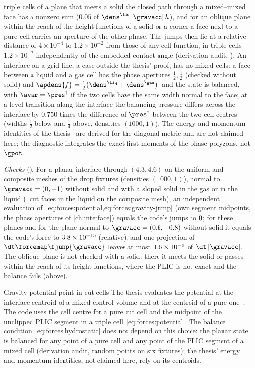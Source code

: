triple cells of a plane that meets a solid the closed path through a
mixed--mixed face has a nonzero sum ($0.05$ of
$\dens^{\liq}\abs{\gravacc}h$), and for an oblique plane within the reach of
the height functions of a solid or a corner a face next to a pure cell carries
an aperture of the other phase. The jumps then lie at a relative distance of
$4\times10^{-4}$ to $1.2\times10^{-2}$ from those of any cell function, in
triple cells $1.2\times10^{-2}$ independently of the embedded contact angle
(derivation audit, ). An interface on a grid
line, a case outside the thesis' proof, has no mixed cells: a face between a
liquid and a gas cell has the phase apertures $\tfrac12,\tfrac12$ (checked
without solid) and $\apdens{f}=\tfrac12(\dens^{\liq}+\dens^{\gas})$, and the
state is balanced, with $\avar=\pres^{\dagger}$ if the two cells have the
same width normal to the face; at a level transition along the interface the
balancing pressure differs across the interface by $0.750$ times the
difference of $\pres^{\dagger}$ between the two cell centres (widths
$\tfrac12$ below and $\tfrac14$ above, densities $(1000,1)$). The energy and
momentum identities of the thesis~ are derived
for the diagonal metric and are not claimed here; the diagnostic
 integrates the exact first moments of the phase
polygons, not $\gpot$.

\emph{Checks} (). For a planar interface through
$(4.3,4.6)$ on the uniform and composite meshes of the drop fixtures
(densities $(1000,1)$), normal to $\gravacc=(0,-1)$ without solid and with
a sloped solid in the gas or in the liquid (\chkGravityLiquidCut\ cut faces
in the liquid on the composite mesh), an independent evaluation
of~\cref{eq:forces:potential,eq:forces:gravity-jump} (own segment midpoints,
the phase apertures of \cref{ch:interface}) equals the code's jumps to
$0$; for these planes and for the plane normal to
$\gravacc=(0.6,-0.8)$ without solid it equals the code's force to
$3.8\times10^{-15}$ (relative), and one projection of
$\dt\forcemap\fjump{\gravacc}$ leaves at most $1.6\times10^{-9}$ of
$\dt\abs{\gravacc}$. The oblique plane is not checked with a solid: there it
meets the solid or passes within the reach of its height functions, where
the PLIC is not exact and the balance fails (above).

\begin{deviation}{Gravity potential point in cut cells}\label{dev:forces:gravity-cut}
The thesis evaluates the potential at the interface centroid of a mixed
control volume and at the centroid of a pure one~. The
code uses the cell centre for a pure cut cell and the midpoint of the
unclipped PLIC segment in a triple cell~\cref{eq:forces:potential}. The
balance condition~\cref{eq:forces:hydrostatic} does not depend on this
choice: the planar state is balanced for any point of a pure cell and any
point of the PLIC segment of a mixed cell (derivation audit, random points
on six fixtures); the thesis' energy and momentum identities, not claimed
here, rely on its centroids.
\end{deviation}

